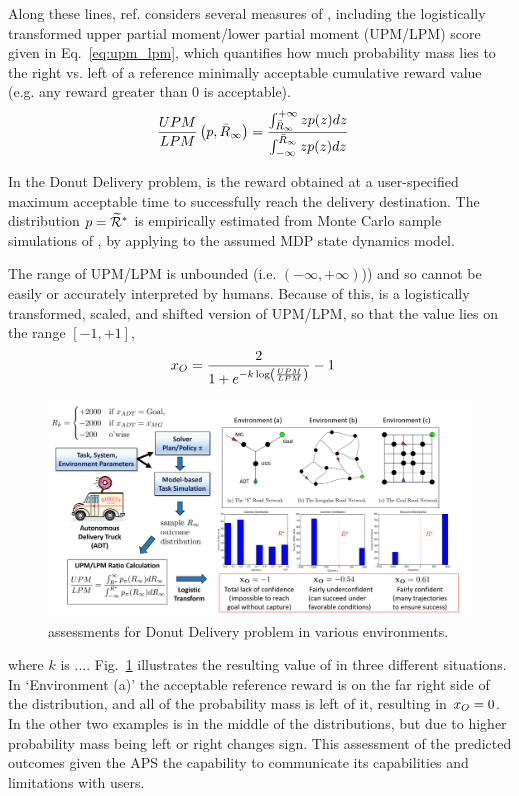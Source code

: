 Along these lines, ref. \cite{Aitken2016-cv} considers several measures of \rwdopt, including the logistically transformed upper partial moment/lower partial moment (UPM/LPM) score given in Eq.~\ref{eq:upm_lpm}, which quantifies how much probability mass lies to the right vs. left of a reference minimally acceptable cumulative reward value \ris{} (e.g. any reward greater than 0 is acceptable).
    \begin{align}
        \frac{UPM}{LPM}\left(p,\riref\right) &= \frac{\int_{\riref}^{+\infty}zp(z)dz}{\int_{-\infty}^{\riref} zp(z)dz} \label{eq:upm_lpm}
    \end{align}

In the Donut Delivery problem, \riref{} is the reward obtained at a user-specified maximum acceptable time to successfully reach the delivery destination. The distribution $p = \widetilde{\mathcal{R}}^*$ is empirically estimated from Monte Carlo sample simulations of \rwdopt, by applying \piopt{} to the assumed MDP state dynamics model.

The range of UPM/LPM is unbounded (i.e. $(-\infty,+\infty)$)) and so cannot be easily or accurately interpreted by humans. Because of this, \xO{} is a logistically transformed, scaled, and shifted version of UPM/LPM, so that the value lies on the range $[-1,+1]$, 
    \begin{align}
        \xO &= \frac{2}{1+e^{-k\log\left(\frac{UPM}{LPM}\right)}}-1 \label{eq:xO}
    \end{align}
    \begin{figure}[tbp]
        \centering
        \includegraphics[width=0.95\linewidth]{Figures/xO_FullADT.png}
        \caption{\xO{} assessments for Donut Delivery problem in various environments. }
        \label{fig:xOexample}
    \end{figure}
\noindent where $k$ is .... 
Fig.~\ref{fig:xOexample} illustrates the resulting value of \xO{} in three different situations. In `Environment (a)' the acceptable reference reward \ris{} is on the far right side of the distribution, and all of the probability mass is left of it, resulting in $x_O=0$. In the other two examples \ris{} is in the middle of the distributions, but due to higher probability mass being left or right \xO{} changes sign. This assessment of the predicted outcomes given the APS the capability to communicate its capabilities and limitations with users.

